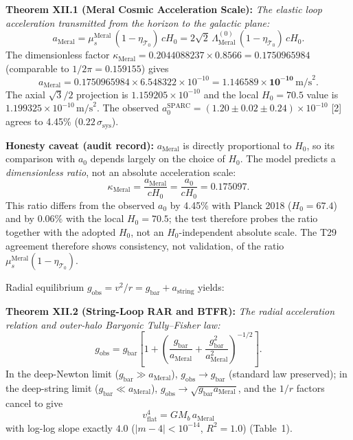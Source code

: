 \documentclass[12pt,a4paper]{article}
\begin{document}
\textbf{Theorem XII.1 (Meral Cosmic Acceleration Scale):} \textit{The
elastic loop acceleration transmitted from the horizon to the
galactic plane:}
\begin{equation}
\label{eq:ameral}
\boxed{a_{\mathrm{Meral}} = \mu_s^{\mathrm{Meral}}\,(1-\eta_{\mathcal{T}_0})\,cH_0
= 2\sqrt{2}\,\Lambda_{\mathrm{Meral}}^{(0)}\,(1-\eta_{\mathcal{T}_0})\,cH_0.}
\end{equation}
The dimensionless factor
$\kappa_{\mathrm{Meral}} = 0.2044088237\times 0.8566 = 0.1750965984$
(comparable to $1/2\pi = 0.159155$) gives
\begin{equation}
a_{\mathrm{Meral}} = 0.1750965984\times 6.548322\times 10^{-10}
= \mathbf{1.146589\times 10^{-10}}\,\mathrm{m/s}^2.
\end{equation}
The axial $\sqrt{3}/2$ projection is $1.159205\times 10^{-10}$ and the local
$H_0 = 70.5$ value is $1.199325\times 10^{-10}\,\mathrm{m/s}^2$.
The observed $a_0^{\mathrm{SPARC}} = (1.20\pm 0.02\pm 0.24)\times 10^{-10}$ [2]
agrees to 4.45\% ($0.22\,\sigma_{\mathrm{sys}}$).

\textbf{Honesty caveat (audit record):} $a_{\mathrm{Meral}}$ is directly
proportional to $H_0$, so its comparison with $a_0$ depends largely on the
choice of $H_0$. The model predicts a \emph{dimensionless ratio}, not an
absolute acceleration scale:
$$\kappa_{\mathrm{Meral}}=\frac{a_{\mathrm{Meral}}}{cH_0}
=\frac{a_0}{cH_0}=0.175097 .$$
This ratio differs from the observed $a_0$ by 4.45\% with Planck 2018
($H_0=67.4$) and by 0.06\% with the local $H_0=70.5$; the test therefore
probes the ratio together with the adopted $H_0$, not an $H_0$-independent
absolute scale. The T29 agreement therefore shows consistency, not
validation, of the ratio $\mu_s^{\mathrm{Meral}}(1-\eta_{\mathcal{T}_0})$.

Radial equilibrium $g_{\mathrm{obs}} = v^2/r = g_{\mathrm{bar}} + a_{\mathrm{string}}$
yields:

\textbf{Theorem XII.2 (String-Loop RAR and BTFR):} \textit{The
radial acceleration relation and outer-halo Baryonic Tully--Fisher law:}
\begin{equation}
\label{eq:rar}
\boxed{g_{\mathrm{obs}} = g_{\mathrm{bar}}\left[1+\left(
\frac{g_{\mathrm{bar}}}{a_{\mathrm{Meral}}}
+\frac{g_{\mathrm{bar}}^2}{a_{\mathrm{Meral}}^2}\right)^{-1/2}\right].}
\end{equation}
In the deep-Newton limit ($g_{\mathrm{bar}}\gg a_{\mathrm{Meral}}$),
$g_{\mathrm{obs}}\to g_{\mathrm{bar}}$ (standard law preserved); in the
deep-string limit ($g_{\mathrm{bar}}\ll a_{\mathrm{Meral}}$),
$g_{\mathrm{obs}}\to\sqrt{g_{\mathrm{bar}}a_{\mathrm{Meral}}}$, and the $1/r$
factors cancel to give
\begin{equation}
\boxed{v_{\mathrm{flat}}^4 = GM_b\,a_{\mathrm{Meral}}}
\end{equation}
with log-log slope exactly $4.0$ ($|m-4|<10^{-14}$, $R^2 = 1.0$) (Table~1).
\end{document}
